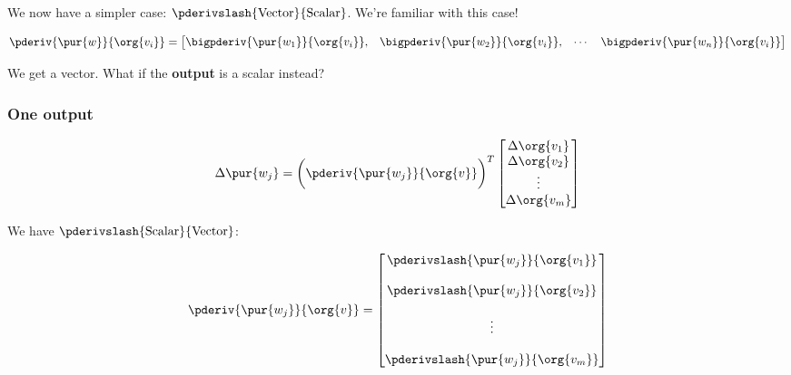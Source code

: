             We now have a simpler case: $\pderivslash{ \text{Vector} }{ \text{Scalar} }$. We're familiar with this case!
            
            \begin{equation}
                \pderiv{ \pur{w} }{ \org{v_i} } 
                =
                \begin{bmatrix}
                    \bigpderiv{ \pur{w_1} }{ \org{v_i} }, &
                    \bigpderiv{ \pur{w_2} }{ \org{v_i} }, &
                    \cdots &
                    \bigpderiv{ \pur{w_n} }{ \org{v_i} } 
                \end{bmatrix}
            \end{equation}
        
            We get a vector. What if the \textbf{output} is a scalar instead?
        
        \subsubsection*{One output}
        
            \begin{equation}
                \Delta \pur{w_j}
                =
                \bigg(
                    \pderiv{ \pur{w_j} }{ \org{v} } 
                \bigg)^T
                \begin{bmatrix}
                    \Delta \org{v_1}\\ \Delta \org{v_2}\\ \vdots \\ \Delta \org{v_m}
                \end{bmatrix}
            \end{equation}
            
            We have $\pderivslash{ \text{Scalar} }{ \text{Vector} }$:
            
            \begin{equation}
                \pderiv{ \pur{w_j} }{ \org{v} } 
                =
                \begin{bmatrix}
                    \pderivslash{ \pur{w_j} }   { \org{v_1} }\\\\
                    \pderivslash{ \pur{w_j} }   { \org{v_2} }\\\\
                    \vdots \\\\
                    \pderivslash{ \pur{w_j} }   { \org{v_m} }
                \end{bmatrix}
            \end{equation}
            

